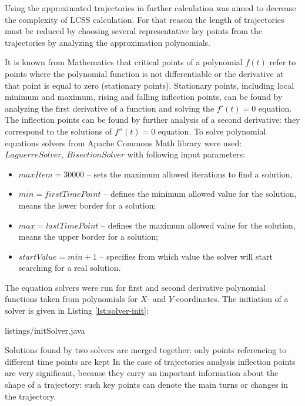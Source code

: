 Using the approximated trajectories in further calculation was aimed to decrease the complexity of LCSS calculation. For that reason the length of trajectories must be reduced by choosing several representative key points from the trajectories by analyzing the approximation polynomials.

It is known from Mathematics that critical points of a polynomial $f(t)$ refer to points where the polynomial function is not differentiable or the derivative at that point is equal to zero (stationary points). Stationary points, including local minimum and maximum, rising and falling inflection points, can be found by analyzing the first derivative of a function and solving the $f'(t) = 0$ equation. The inflection points can be found by further analysis of a second derivative: they correspond to the solutions of $f''(t) = 0$ equation. To solve polynomial equations solvers from Apache Commons Math library were used: $LaguerreSolver$, $BisectionSolver$ with following input parameters:

\begin{itemize}
	\setlength\itemsep{0em}
	\item $maxItem = 30000$ -- sets the maximum allowed iterations to find a solution,
	\item $min = firstTimePoint$ -- defines the minimum allowed value for the solution, means the lower border for a solution;
	\item $max = lastTimePoint$ -- defines the maximum allowed value for the solution, means the upper border for a solution;
	\item $startValue = min + 1$ -- specifies from which value the solver will start searching for a real solution.
\end{itemize}

The equation solvers were run for first and second derivative polynomial functions taken from polynomials for $X$- and $Y$-coordinates. The initiation of a solver is given in Listing \ref{lst:solver-init}:

 {listings/initSolver.java}

Solutions found by two solvers are merged together: only points referencing to different time points are kept In the case of trajectories analysis inflection points are very significant, because they carry an important information about the shape of a trajectory: such key points can denote the main turns or changes in the trajectory.

